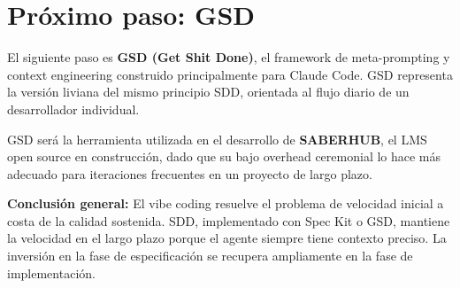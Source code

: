 \documentclass[12pt, a4paper]{report}
\begin{document}
\section{Pr\'oximo paso: GSD}

El siguiente paso es \textbf{GSD (Get Shit Done)}, el framework de
meta-prompting y context engineering construido principalmente para
Claude Code. GSD representa la versi\'on liviana del mismo principio SDD,
orientada al flujo diario de un desarrollador individual.

GSD ser\'a la herramienta utilizada en el desarrollo de \textbf{SABERHUB},
el LMS open source en construcci\'on, dado que su bajo overhead ceremonial
lo hace m\'as adecuado para iteraciones frecuentes en un proyecto de largo
plazo.

\vspace{1cm}

\begin{notacaja}
  \textbf{Conclusi\'on general:} El vibe coding resuelve el problema de
  velocidad inicial a costa de la calidad sostenida. SDD, implementado
  con Spec Kit o GSD, mantiene la velocidad en el largo plazo porque el
  agente siempre tiene contexto preciso. La inversi\'on en la fase de
  especificaci\'on se recupera ampliamente en la fase de implementaci\'on.
\end{notacaja}
\end{document}
